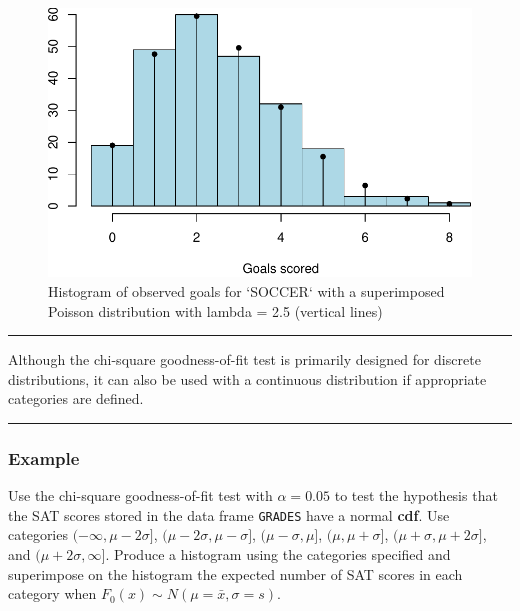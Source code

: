 \documentclass[
]{article}
\begin{document}
\begin{figure}

{\centering \includegraphics{SDM-CHAP22_files/figure-latex/histo-1} 

}

\caption{Histogram of observed goals for `SOCCER` with a superimposed Poisson distribution with lambda = 2.5 (vertical lines)}\label{fig:histo}
\end{figure}

\begin{center}\rule{0.5\linewidth}{0.5pt}\end{center}

Although the chi-square goodness-of-fit test is primarily designed for discrete distributions, it can also be used with a continuous distribution if appropriate categories are defined.

\begin{center}\rule{0.5\linewidth}{0.5pt}\end{center}

\hypertarget{example-1}{%
\subsubsection*{Example}\label{example-1}}

Use the chi-square goodness-of-fit test with \(\alpha=0.05\) to test the hypothesis that the SAT scores stored in the data frame \texttt{GRADES} have a normal \textbf{cdf}. Use categories \((-\infty, \mu-2\sigma]\), \((\mu-2\sigma, \mu-\sigma]\), \((\mu-\sigma, \mu]\), \((\mu, \mu+\sigma]\), \((\mu+\sigma, \mu+2\sigma]\), and \((\mu+2\sigma, \infty]\). Produce a histogram using the categories specified and superimpose on the histogram the expected number of SAT scores in each category when \(F_0(x)\sim N(\mu=\bar{x}, \sigma=s)\).
\end{document}
